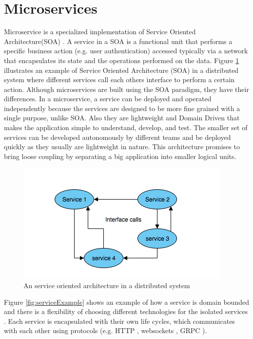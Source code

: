 \section{Microservices}

Microservice is a specialized implementation of Service Oriented Architecture(SOA) \cite[chapter ~3]{SOA}. A service in a SOA
is a functional unit that performs a specific business action (e.g. user authentication) accessed typically via a network that 
encapsulates its state and the operations performed on the data.  
Figure \ref{fig:objectBasedDS} illustrates an example of Service Oriented Architecture (SOA) in a distributed system where different services call each others interface
to perform a certain action. Although microservices are built using the SOA paradigm, they have their differences. In a microservice, a service can be deployed and 
operated independently because the services are designed to be more fine grained with a single purpose, unlike SOA. 
Also they are lightweight and Domain Driven \cite{DDD} that makes the application simple to understand, develop, and test. The smaller set of services
can be developed autonomously by different teams and be deployed quickly as they usually are lightweight in nature. This architecture promises to bring loose coupling 
by separating a big application into smaller logical units. 


\begin{figure}[H]
    \centering \includegraphics[scale=0.7]{grafiken/objectBasedDS.png}
    \caption{An service oriented architecture in a distributed system 
        \cite[p.~62]{DistributedSystems}}
    \label{fig:objectBasedDS}
\end{figure}


Figure \ref{fig:serviceExample} shows an example of how 
a service is domain bounded and there is a flexibility of choosing different
technologies for the isolated services \cite{MicroserviceNewMan}. 
Each service is encapsulated with their own life cycles, which communicates with each other using protocols 
(e.g. HTTP \cite{HTTP}, websockets \cite{WebSockets}, GRPC \cite{grpc}). 

